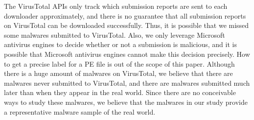 The VirusTotal APIs only track which submission reports are sent to each downloader approximately, 
and there is no guarantee that all submission reports on VirusTotal can be downloaded successfully. 
Thus, it is possible that we missed some malwares submitted to VirusTotal. 
Also, we only leverage Microsoft antivirus engines to decide whether or not a submission is malicious, 
and it is possible that Microsoft antivirus engines cannot make this decision precisely. 
How to get a precise label for a PE file is out of the scope of this paper.  
Although there is a huge amount of malwares on VirusTotal, we believe that there are malwares never submitted to VirusTotal, 
and there are malwares submitted much later than when they appear in the real world.
Since there are no conceivable ways to study these malwares,
we believe that the malwares in our study provide a representative malware sample of the real world. 


